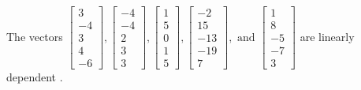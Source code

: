 \begin{exercise}
\begin{exerciseStatement}
  \end{exerciseStatement}
  \begin{exerciseAnswer}
   The vectors \(\left[\begin{array}{r}
3 \\
-4 \\
3 \\
4 \\
-6
\end{array}\right] , \left[\begin{array}{r}
-4 \\
-4 \\
2 \\
3 \\
3
\end{array}\right] , \left[\begin{array}{r}
1 \\
5 \\
0 \\
1 \\
5
\end{array}\right] , \left[\begin{array}{r}
-2 \\
15 \\
-13 \\
-19 \\
7
\end{array}\right] , \text{ and } \left[\begin{array}{r}
1 \\
8 \\
-5 \\
-7 \\
3
\end{array}\right]\) are 
  	 linearly dependent  .
  


  \end{exerciseAnswer}
\end{exercise}